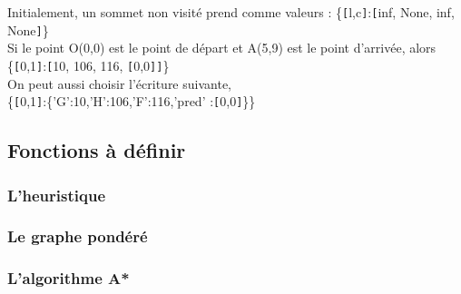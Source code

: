 Initialement, un sommet non visité prend comme valeurs :
\{\verb![!l,c\verb!]!:\verb![!inf, None, inf, None\verb!]!\}\\
Si le point O(0,0) est le point de départ et A(5,9) est le point d'arrivée, alors\\
\{\verb![!0,1\verb!]!:\verb![!10, 106, 116, \verb![!0,0\verb!]!\verb!]!\}\\
On peut aussi choisir l'écriture suivante,\\
\{\verb![!0,1\verb!]!:\{'G':10,'H':106,'F':116,'pred' :\verb![!0,0\verb!]!\}\}


\newpage
\subsection{Fonctions à définir}
\subsubsection{L'heuristique}

\vspace{10cm}



\subsubsection{Le graphe pondéré}

\vspace{10cm}



\subsubsection{L'algorithme A*}




